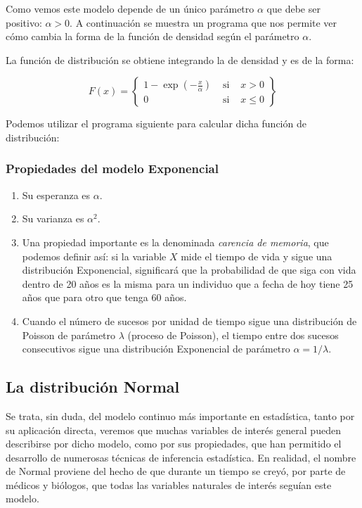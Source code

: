 \documentclass[
  a4paper,
  DIV=11,
  numbers=noendperiod]{scrreprt}
\begin{document}
Como vemos este modelo depende de un único parámetro \(\alpha\) que debe
ser positivo: \(\alpha>0\). A continuación se muestra un programa que
nos permite ver cómo cambia la forma de la función de densidad según el
parámetro \(\alpha\).

La función de distribución se obtiene integrando la de densidad y es de
la forma:

\[
F(x)=\left\{\begin{array}{lll}
1-\exp \left(-\frac{x}{\alpha}\right) & \text { si } & x>0 \\
0 & \text { si } & x \leq 0
\end{array}\right\}
\]

Podemos utilizar el programa siguiente para calcular dicha función de
distribución:

\subsubsection{Propiedades del modelo
Exponencial}\label{propiedades-del-modelo-exponencial}

\begin{enumerate}
\def\labelenumi{\arabic{enumi}.}
\item
  Su esperanza es \(\alpha\).
\item
  Su varianza es \(\alpha^{2}\).
\item
  Una propiedad importante es la denominada \emph{carencia de memoria},
  que podemos definir así: si la variable \(X\) mide el tiempo de vida y
  sigue una distribución Exponencial, significará que la probabilidad de
  que siga con vida dentro de 20 años es la misma para un individuo que
  a fecha de hoy tiene 25 años que para otro que tenga 60 años.
\item
  Cuando el número de sucesos por unidad de tiempo sigue una
  distribución de Poisson de parámetro \(\lambda\) (proceso de Poisson),
  el tiempo entre dos sucesos consecutivos sigue una distribución
  Exponencial de parámetro \(\alpha=1 / \lambda\).
\end{enumerate}

\subsection{La distribución Normal}\label{la-distribuciuxf3n-normal}

Se trata, sin duda, del modelo continuo más importante en estadística,
tanto por su aplicación directa, veremos que muchas variables de interés
general pueden describirse por dicho modelo, como por sus propiedades,
que han permitido el desarrollo de numerosas técnicas de inferencia
estadística. En realidad, el nombre de Normal proviene del hecho de que
durante un tiempo se creyó, por parte de médicos y biólogos, que todas
las variables naturales de interés seguían este modelo.
\end{document}
